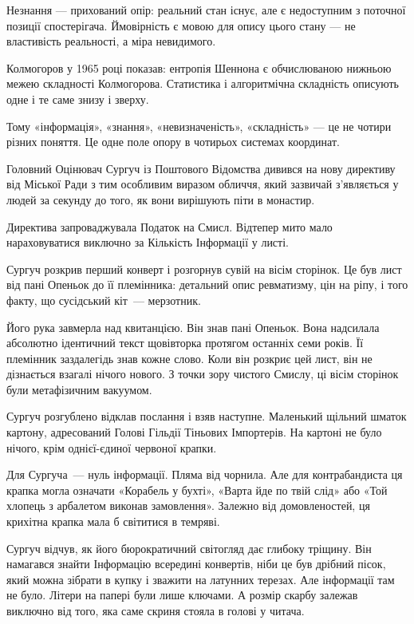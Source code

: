 \documentclass[12pt, a4paper, openany]{book}
\begin{document}
Незнання — прихований опір: реальний стан існує, але є недоступним з поточної позиції спостерігача. Ймовірність є мовою для опису цього стану — не властивість реальності, а міра невидимого.

Колмогоров у 1965 році показав: ентропія Шеннона є обчислюваною нижньою межею складності Колмогорова. Статистика і алгоритмічна складність описують одне і те саме знизу і зверху.

Тому «інформація», «знання», «невизначеність», «складність» — це не чотири різних поняття. Це одне поле опору в чотирьох системах координат.


\begin{terrybox}
Головний Оцінювач Сургуч із Поштового Відомства дивився на нову директиву від Міської Ради з тим особливим виразом обличчя, який зазвичай з'являється у людей за секунду до того, як вони вирішують піти в монастир.

Директива запроваджувала Податок на Смисл. Відтепер мито мало нараховуватися виключно за Кількість Інформації у листі.

Сургуч розкрив перший конверт і розгорнув сувій на вісім сторінок. Це був лист від пані Опеньок до її племінника: детальний опис ревматизму, цін на ріпу, і того факту, що сусідський кіт~--- мерзотник.

Його рука завмерла над квитанцією. Він знав пані Опеньок. Вона надсилала абсолютно ідентичний текст щовівторка протягом останніх семи років. Її племінник заздалегідь знав кожне слово. Коли він розкриє цей лист, він не дізнається взагалі нічого нового. З точки зору чистого Смислу, ці вісім сторінок були метафізичним вакуумом.

Сургуч розгублено відклав послання і взяв наступне. Маленький щільний шматок картону, адресований Голові Гільдії Тіньових Імпортерів. На картоні не було нічого, крім однієї-єдиної червоної крапки.

Для Сургуча~--- нуль інформації. Пляма від чорнила. Але для контрабандиста ця крапка могла означати «Корабель у бухті», «Варта йде по твій слід» або «Той хлопець з арбалетом виконав замовлення». Залежно від домовленостей, ця крихітна крапка мала б світитися в темряві.

Сургуч відчув, як його бюрократичний світогляд дає глибоку тріщину. Він намагався знайти Інформацію всередині конвертів, ніби це був дрібний пісок, який можна зібрати в купку і зважити на латунних терезах. Але інформації там не було. Літери на папері були лише ключами. А розмір скарбу залежав виключно від того, яка саме скриня стояла в голові у читача.


\end{terrybox}
\end{document}
